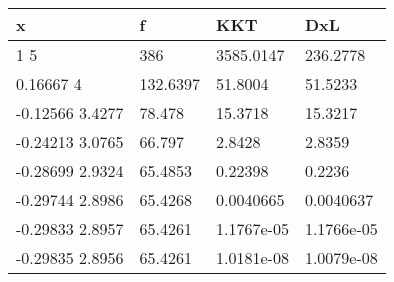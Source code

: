 \begin{tabular}{llll}
x & f & KKT & DxL \\ 
\hline 
1  5 & 386 & 3585.0147 & 236.2778 \\ 
0.16667           4 & 132.6397 & 51.8004 & 51.5233 \\ 
-0.12566      3.4277 & 78.478 & 15.3718 & 15.3217 \\ 
-0.24213      3.0765 & 66.797 & 2.8428 & 2.8359 \\ 
-0.28699      2.9324 & 65.4853 & 0.22398 & 0.2236 \\ 
-0.29744      2.8986 & 65.4268 & 0.0040665 & 0.0040637 \\ 
-0.29833      2.8957 & 65.4261 & 1.1767e-05 & 1.1766e-05 \\ 
-0.29835      2.8956 & 65.4261 & 1.0181e-08 & 1.0079e-08 \\ 
\hline 
\end{tabular}